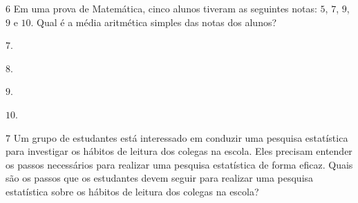 

\num{6}  Em uma prova de Matemática, cinco alunos tiveram as seguintes notas:
$5$, $7$, $9$, $9$ e $10$. Qual é a média aritmética simples das notas dos alunos?

\begin{escolha}
\item $7$.
\item $8$.
\item $9$.
\item $10$.
\end{escolha}



\num{7} Um grupo de estudantes está interessado em conduzir uma pesquisa
estatística para investigar os hábitos de leitura dos colegas na escola.
Eles precisam entender os passos necessários para realizar uma pesquisa
estatística de forma eficaz. Quais são os passos que os estudantes devem
seguir para realizar uma pesquisa estatística sobre os hábitos de leitura
dos colegas na escola?

